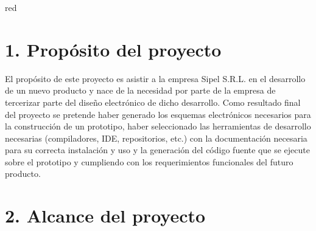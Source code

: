 \documentclass[11pt]{charter}
\begin{document}
\begin{consigna}{red}
%
%
%
% 

\end{consigna}



\section{1. Propósito del proyecto}
\label{sec:proposito}

%

El propósito de este proyecto es asistir a la empresa Sipel S.R.L. en el desarrollo de un nuevo producto y nace de la necesidad por parte de la empresa de tercerizar parte del diseño electrónico de dicho desarrollo. Como resultado final del proyecto se pretende haber generado los esquemas electrónicos necesarios para la construcción de un prototipo, haber seleccionado las herramientas de desarrollo necesarias (compiladores, IDE, repositorios, etc.) con la documentación necesaria para su correcta instalación y uso y la generación  del código fuente que se ejecute sobre el prototipo y cumpliendo con los requerimientos funcionales del futuro producto.


\section{2. Alcance del proyecto}
\label{sec:alcance}

%
%
%
%
\end{document}
